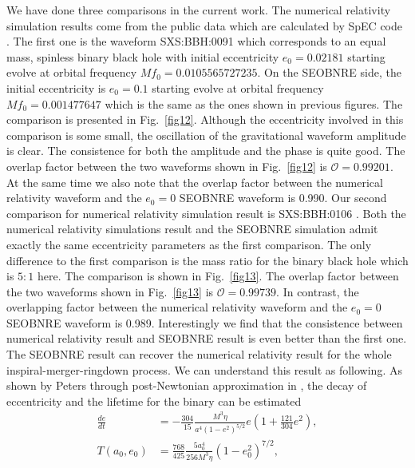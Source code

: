 \documentclass[prd,aps,a4paper,superscriptaddress,twocolumn,footinbib,showpacs]{revtex4}
\begin{document}
We have done three comparisons in the current work. The numerical relativity simulation results come from the public data \cite{SXSBBH} which are calculated by SpEC code \cite{PhysRevD.86.084033}. The first one is the waveform SXS:BBH:0091 \cite{SXSBBH} which corresponds to an equal mass, spinless binary black hole with initial eccentricity $e_0=0.02181$ starting evolve at orbital frequency $Mf_0=0.0105565727235$. On the SEOBNRE side, the initial eccentricity is $e_0=0.1$ starting evolve at orbital frequency $Mf_0=0.001477647$ which is the same as the ones shown in previous figures. The comparison is presented in Fig.~\ref{fig12}. Although the eccentricity involved in this comparison is some small, the oscillation of the gravitational waveform amplitude is clear. The consistence for both the amplitude and the phase is quite good. The overlap factor between the two waveforms shown in Fig.~\ref{fig12} is $\mathcal{O}=0.99201$. At the same time we also note that the overlap factor between the numerical relativity waveform and the $e_0=0$ SEOBNRE waveform is 0.990. Our second comparison for numerical relativity simulation result is SXS:BBH:0106 \cite{SXSBBH}. Both the numerical relativity simulations result and the SEOBNRE simulation admit exactly the same eccentricity parameters as the first comparison. The only difference to the first comparison is the mass ratio for the binary black hole which is $5:1$ here. The comparison is shown in Fig.~\ref{fig13}. The overlap factor between the two waveforms shown in Fig.~\ref{fig13} is $\mathcal{O}=0.99739$. In contrast, the overlapping factor between the numerical relativity waveform and the $e_0=0$ SEOBNRE waveform is 0.989. Interestingly we find that the consistence between numerical relativity result and SEOBNRE result is even better than the first one. The SEOBNRE result can recover the numerical relativity result for the whole inspiral-merger-ringdown process. We can understand this result as following. As shown by Peters through post-Newtonian approximation in \cite{PhysRev.136.B1224}, the decay of eccentricity and the lifetime for the binary can be estimated
\begin{align}
\frac{de}{dt}&=-\frac{304}{15}\frac{M^3\eta}{a^4(1-e^2)^{5/2}}e(1+\frac{121}{304}e^2),\\
T(a_0,e_0)&=\frac{768}{425}\frac{5a_0^4}{256M^3\eta}(1-e_0^2)^{7/2},
\end{align}
\end{document}
